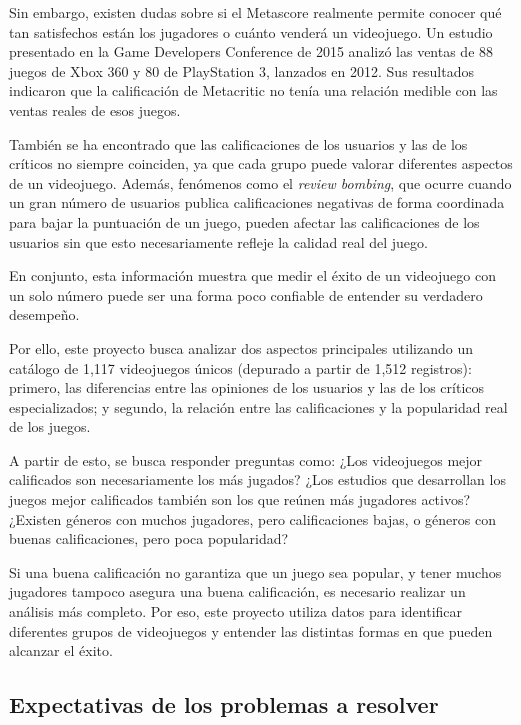 \documentclass[letterpaper,11pt]{article}
\begin{document}
Sin embargo, existen dudas sobre si el Metascore realmente permite conocer qué tan satisfechos están los jugadores o cuánto venderá un videojuego. Un estudio presentado en la Game Developers Conference de 2015 analizó las ventas de 88 juegos de Xbox 360 y 80 de PlayStation 3, lanzados en 2012. Sus resultados indicaron que la calificación de Metacritic no tenía una relación medible con las ventas reales de esos juegos.

También se ha encontrado que las calificaciones de los usuarios y las de los críticos no siempre coinciden, ya que cada grupo puede valorar diferentes aspectos de un videojuego. Además, fenómenos como el \textit{review bombing}, que ocurre cuando un gran número de usuarios publica calificaciones negativas de forma coordinada para bajar la puntuación de un juego, pueden afectar las calificaciones de los usuarios sin que esto necesariamente refleje la calidad real del juego.

En conjunto, esta información muestra que medir el éxito de un videojuego con un solo número puede ser una forma poco confiable de entender su verdadero desempeño.

Por ello, este proyecto busca analizar dos aspectos principales utilizando un catálogo de 1,117 videojuegos únicos (depurado a partir de 1,512 registros): primero, las diferencias entre las opiniones de los usuarios y las de los críticos especializados; y segundo, la relación entre las calificaciones y la popularidad real de los juegos.

A partir de esto, se busca responder preguntas como: ¿Los videojuegos mejor calificados son necesariamente los más jugados? ¿Los estudios que desarrollan los juegos mejor calificados también son los que reúnen más jugadores activos? ¿Existen géneros con muchos jugadores, pero calificaciones bajas, o géneros con buenas calificaciones, pero poca popularidad?

Si una buena calificación no garantiza que un juego sea popular, y tener muchos jugadores tampoco asegura una buena calificación, es necesario realizar un análisis más completo. Por eso, este proyecto utiliza datos para identificar diferentes grupos de videojuegos y entender las distintas formas en que pueden alcanzar el éxito.

\newpage
\subsection*{Expectativas de los problemas a resolver}
\end{document}
